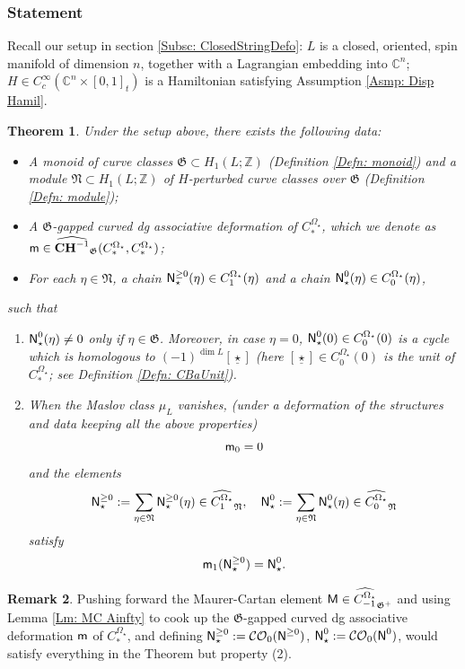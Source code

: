 \documentclass[10pt]{amsart}
\numberwithin{equation}{section}
\theoremstyle{plain}
\newtheorem{theorem}{Theorem}[section]
\theoremstyle{definition}
\newtheorem{remark}[theorem]{Remark}
\theoremstyle{remark}
\numberwithin{equation}{section}
\newcommand{\Z}{\mathbb{Z}}
\newcommand{\C}{\mathbb{C}}
\newcommand{\wh}[1]{\widehat{#1}}
\newcommand{\mf}[1]{\mathfrak{#1}}
\newcommand{\CO}{\mathcal{CO}}
\newcommand{\CC}{\textbf{\textup{CH}}}
\newcommand{\CBa}{C_*^{\Omega_\star}}
\newcommand{\Cba}[1]{C_{#1}^{\Omega_\star}}
\newcommand{\MM}{\textup{\textsf{M}}}
\newcommand{\mm}{\textup{\textsf{m}}}
\newcommand{\NN}{\textup{\textsf{N}}}
\newcommand{\NNN}{\textup{\textsf{N}}_\star}
\begin{document}
{\subsubsection{Statement}
Recall our setup in section \ref{Subsc: ClosedStringDefo}: $L$ is a closed, oriented, spin manifold of dimension $n$, together with a Lagrangian embedding into $\C^n$; $H\in  C_c^\infty(\C^n\times [0,1]_t)$ is a Hamiltonian satisfying Assumption \ref{Asmp: Disp Hamil}.




\begin{theorem}\label{Cor: BasedAinfty}
	Under the setup above, there exists the following data:
	\begin{itemize}
		\item A monoid of curve classes $\mathfrak{G}\subset H_1(L;\Z)$ (Definition \ref{Defn: monoid})  and a module $\mathfrak{N}\subset H_1(L;\Z)$ of $H$-perturbed curve classes over $\mathfrak{G}$ (Definition \ref{Defn: module});
		\item A $\mf{G}$-gapped curved dg associative deformation of $\CBa$, which we denote as  $\mm \in \wh{\CC^{-1}}_\mf{G}(\CBa,\CBa)$;
		\item For each $\eta\in\mathfrak{N}$, a chain $\NNN^{\geq 0}(\eta)\in \Cba{1}(\eta)$ and a chain $\NNN^0(\eta)\in \Cba{0}(\eta)$,
	\end{itemize}
	such that 
	\begin{enumerate}
		\item $\NNN^0(\eta)\neq 0$ only if $\eta \in \mf{G}$. Moreover, in case $\eta = 0$, $\NNN^0(0) \in \Cba{0}(0)$ is a cycle which is homologous to $(-1)^{\dim L} [\underline{\star}]$ (here $[\underline{\star}]\in \Cba{0}(0)$ is the unit of $\CBa$; see Definition \ref{Defn: CBaUnit}).
		\item When the Maslov class $\mu_L$ vanishes, (under a deformation of the structures and data keeping all the above properties) \[ \mm_0=0\] and  the elements \[ \NNN^{\geq 0}:= \sum_{\eta\in\mathfrak{N}} \NNN^{\geq 0}(\eta)\in \wh{\Cba{1}}_{\mathfrak{N}} , \quad \NNN^0:= \sum_{\eta\in\mathfrak{N}} \NNN^0(\eta) \in \wh{\Cba{0}}_{\mathfrak{N}}\]
		 satisfy \[ \mm_1(\NNN^{\geq 0}) = \NNN^0.  \]
	\end{enumerate}
\end{theorem}


\begin{remark}\label{Rmk: PfBasedAinfty}
Pushing forward the Maurer-Cartan element $\MM\in \wh{\Cba{-1}}_{\mf{G}^+}$ and using Lemma \ref{Lm: MC Ainfty} to cook up the $\mf{G}$-gapped curved dg associative deformation $\mm$ of $\CBa$, and defining $\NNN^{\geq 0}:= \CO_0(\NN^{\geq 0})$, $\NNN^0:= \CO_0(\NN^0)$, would  satisfy everything in the Theorem but property (2).


\end{remark}}
\end{document}

